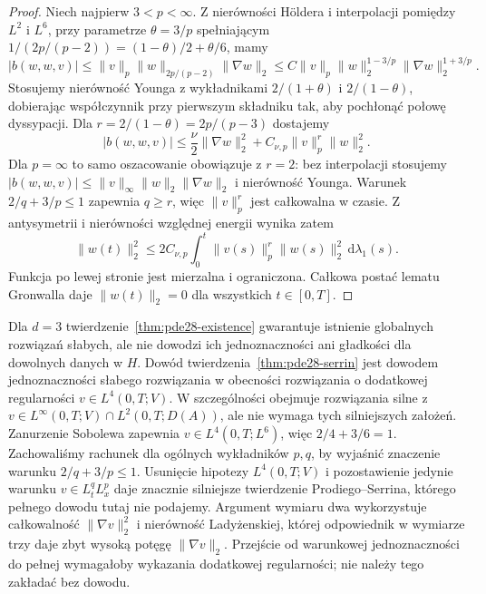 \begin{proof}
Niech najpierw $3<p<\infty$.
Z nierówności Höldera i interpolacji pomiędzy
$L^2$ i $L^6$, przy parametrze $\theta=3/p$
spełniającym $1/(2p/(p-2))=(1-\theta)/2+\theta/6$,
mamy
\[
 |b(w,w,v)|\le\|v\|_p\|w\|_{2p/(p-2)}\|\nabla w\|_2
 \le C\|v\|_p\|w\|_2^{1-3/p}
 \|\nabla w\|_2^{1+3/p}.
\]
Stosujemy nierówność Younga z wykładnikami
$2/(1+\theta)$ i $2/(1-\theta)$,
dobierając współczynnik przy pierwszym składniku
tak, aby pochłonąć połowę dyssypacji.
Dla $r=2/(1-\theta)=2p/(p-3)$ dostajemy
\[
 |b(w,w,v)|\le\frac{\nu}{2}\|\nabla w\|_2^2+
 C_{\nu,p}\|v\|_p^r\|w\|_2^2.
\]
Dla $p=\infty$ to samo oszacowanie obowiązuje
z $r=2$: bez interpolacji stosujemy
$|b(w,w,v)|\le\|v\|_\infty\|w\|_2\|\nabla w\|_2$
i nierówność Younga.
Warunek $2/q+3/p\le1$ zapewnia $q\ge r$,
więc $\|v\|_p^r$ jest całkowalna w czasie.
Z antysymetrii i nierówności względnej energii
wynika zatem
\[
 \|w(t)\|_2^2\le
 2C_{\nu,p}\int_0^t\|v(s)\|_p^r\|w(s)\|_2^2
 \,\mathrm d\lambda_1(s).
\]
Funkcja po lewej stronie jest mierzalna
i ograniczona. Całkowa postać lematu Gronwalla
daje $\|w(t)\|_2=0$ dla wszystkich $t\in[0,T]$.
\end{proof}

\begin{uwaga}
Dla $d=3$ twierdzenie~\ref{thm:pde28-existence} gwarantuje
istnienie globalnych rozwiązań słabych, ale nie dowodzi
ich jednoznaczności ani gładkości dla dowolnych danych w $H$.
Dowód twierdzenia~\ref{thm:pde28-serrin} jest dowodem
jednoznaczności słabego rozwiązania w obecności rozwiązania
o dodatkowej regularności $v\in L^4(0,T;V)$.
W szczególności obejmuje rozwiązania silne z
$v\in L^\infty(0,T;V)\cap L^2(0,T;D(A))$,
ale nie wymaga tych silniejszych założeń.
Zanurzenie Sobolewa zapewnia
$v\in L^4(0,T;L^6)$, więc $2/4+3/6=1$.
Zachowaliśmy rachunek dla ogólnych wykładników
$p,q$, by wyjaśnić znaczenie warunku
$2/q+3/p\le1$. Usunięcie hipotezy $L^4(0,T;V)$
i pozostawienie jedynie warunku $v\in L^q_tL^p_x$
daje znacznie silniejsze twierdzenie Prodiego--Serrina,
którego pełnego dowodu tutaj nie podajemy.
Argument wymiaru dwa wykorzystuje całkowalność
$\|\nabla v\|_2^2$ i nierówność Ladyżenskiej, której
odpowiednik w wymiarze trzy daje zbyt wysoką potęgę
$\|\nabla v\|_2$. Przejście od warunkowej jednoznaczności
do pełnej wymagałoby wykazania dodatkowej regularności;
nie należy tego zakładać bez dowodu.
\end{uwaga}

